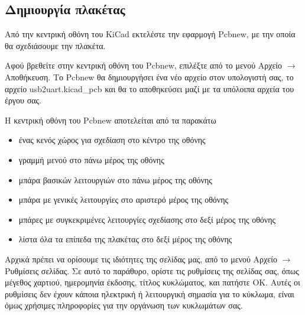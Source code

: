 \documentclass[a4paper]{article}
\begin{document}
\subsection{Δημιουργία πλακέτας}
Από την κεντρική οθόνη του \textenglish{KiCad} εκτελέστε την εφαρμογή \textenglish{Pcbnew}, με την οποία θα σχεδιάσουμε την πλακέτα.

\begin{figure}
  \begin{center}
    \label{fig:kicad-main}
  \end{center}
\end{figure}

Αφού βρεθείτε στην κεντρική οθόνη του \textenglish{Pcbnew}, επιλέξτε από το μενού Αρχείο $\rightarrow$ Αποθήκευση. Το \textenglish{Pcbnew} θα δημιουργήσει ένα νέο αρχείο στον υπολογιστή σας, το αρχείο usb2uart.kicad\_pcb και θα το αποθηκεύσει μαζί με τα υπόλοιπα αρχεία του έργου σας.

H κεντρική οθόνη του \textenglish{Pcbnew} αποτελείται από τα παρακάτω
\begin{itemize}
    \item ένας κενός χώρος για σχεδίαση στο κέντρο της οθόνης
    \item γραμμή μενού στο πάνω μέρος της οθόνης
    \item μπάρα βασικών λειτουργιών στο πάνω μέρος της οθόνης
    \item μπάρα με γενικές λειτουργίες στο αριστερό μέρος της οθόνης
    \item μπάρες με συγκεκριμένες λειτουργίες σχεδίασης στο δεξί μέρος της οθόνης
    \item λίστα όλα τα επίπεδα της πλακέτας στο δεξί μέρος της οθόνης
\end{itemize}

Αρχικά πρέπει να ορίσουμε τις ιδιότητες της σελίδας μας, από το μενού Αρχείο $\rightarrow$ Ρυθμίσεις σελίδας. Σε αυτό το παράθυρο, ορίστε τις ρυθμίσεις της σελίδας σας, όπως μέγεθος χαρτιού, ημερομηνία έκδοσης, τίτλος κυκλώματος, και πατήστε ΟΚ. Αυτές οι ρυθμίσεις δεν έχουν κάποια ηλεκτρική ή λειτουργική σημασία για το κύκλωμα, είναι όμως χρήσιμες πληροφορίες για την οργάνωση των κυκλωμάτων σας.

\begin{figure}
  \begin{center}
    \label{fig:kicad-main}
  \end{center}
\end{figure}
\end{document}
